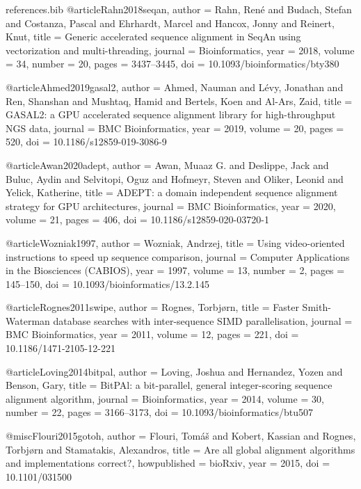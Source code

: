 \begin{filecontents*}[overwrite]{references.bib}
@article{Rahn2018seqan,
  author  = {Rahn, Ren{\'e} and Budach, Stefan and Costanza, Pascal and Ehrhardt, Marcel and Hancox, Jonny and
             Reinert, Knut},
  title   = {Generic accelerated sequence alignment in {SeqAn} using vectorization and multi-threading},
  journal = {Bioinformatics},
  year    = {2018},
  volume  = {34},
  number  = {20},
  pages   = {3437--3445},
  doi     = {10.1093/bioinformatics/bty380}
}

@article{Ahmed2019gasal2,
  author  = {Ahmed, Nauman and L{\'e}vy, Jonathan and Ren, Shanshan and Mushtaq, Hamid and Bertels, Koen and
             Al-Ars, Zaid},
  title   = {{GASAL2}: a {GPU} accelerated sequence alignment library for high-throughput {NGS} data},
  journal = {BMC Bioinformatics},
  year    = {2019},
  volume  = {20},
  pages   = {520},
  doi     = {10.1186/s12859-019-3086-9}
}

@article{Awan2020adept,
  author  = {Awan, Muaaz G. and Deslippe, Jack and Buluc, Aydin and Selvitopi, Oguz and Hofmeyr, Steven and
             Oliker, Leonid and Yelick, Katherine},
  title   = {{ADEPT}: a domain independent sequence alignment strategy for {GPU} architectures},
  journal = {BMC Bioinformatics},
  year    = {2020},
  volume  = {21},
  pages   = {406},
  doi     = {10.1186/s12859-020-03720-1}
}

@article{Wozniak1997,
  author  = {Wozniak, Andrzej},
  title   = {Using video-oriented instructions to speed up sequence comparison},
  journal = {Computer Applications in the Biosciences (CABIOS)},
  year    = {1997},
  volume  = {13},
  number  = {2},
  pages   = {145--150},
  doi     = {10.1093/bioinformatics/13.2.145}
}

@article{Rognes2011swipe,
  author  = {Rognes, Torbj{\o}rn},
  title   = {Faster {Smith-Waterman} database searches with inter-sequence {SIMD} parallelisation},
  journal = {BMC Bioinformatics},
  year    = {2011},
  volume  = {12},
  pages   = {221},
  doi     = {10.1186/1471-2105-12-221}
}

@article{Loving2014bitpal,
  author  = {Loving, Joshua and Hernandez, Yozen and Benson, Gary},
  title   = {{BitPAl}: a bit-parallel, general integer-scoring sequence alignment algorithm},
  journal = {Bioinformatics},
  year    = {2014},
  volume  = {30},
  number  = {22},
  pages   = {3166--3173},
  doi     = {10.1093/bioinformatics/btu507}
}

@misc{Flouri2015gotoh,
  author       = {Flouri, Tom{\'a}{\v{s}} and Kobert, Kassian and Rognes, Torbj{\o}rn and Stamatakis, Alexandros},
  title        = {Are all global alignment algorithms and implementations correct?},
  howpublished = {bioRxiv},
  year         = {2015},
  doi          = {10.1101/031500}
}


\end{filecontents*}
